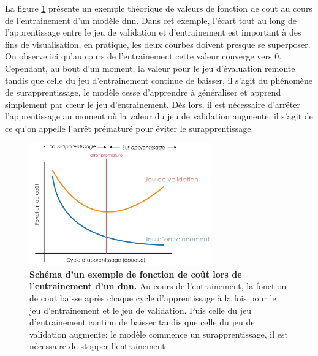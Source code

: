 La figure \ref{fig:loss_func} présente un exemple théorique de valeurs de fonction de cout au cours de l'entrainement d'un modèle \gls{dnn}. Dans cet exemple, l'écart tout au long de l'apprentissage entre le jeu de validation et d'entrainement est important à des fins de visualisation, en pratique, les deux courbes doivent presque se superposer. On observe ici qu'au cours de l'entrainement cette valeur converge vers 0. Cependant, au bout d'un moment, la valeur pour le jeu d'évaluation remonte tandis que celle du jeu d'entrainement continue de baisser, il s'agit du phénomène de surapprentissage, le modèle cesse d'apprendre à généraliser et apprend simplement par cœur le jeu d'entrainement. Dès lors, il est nécessaire d'arrêter l'apprentissage au moment où la valeur du jeu de validation augmente, il s'agit de ce qu'on appelle l'arrêt prématuré pour éviter le surapprentissage.
\begin{figure}[!ht]
 \centering
 \includegraphics[width=0.7\textwidth]{figures/loss_function.png}
 \caption[Schéma d'un exemple de fonction de coût lors d'un entraînement]{\textbf{Schéma d'un exemple de fonction de coût lors de l'entrainement d'un \gls{dnn}.} Au cours de l'entrainement, la fonction de cout baisse après chaque cycle d'apprentissage à la fois pour le jeu d'entrainement et le jeu de validation. Puis celle du jeu d'entrainement continu de baisser tandis que celle du jeu de validation augmente: le modèle commence un surapprentissage, il est nécessaire de stopper l'entrainement}
 \label{fig:loss_func}
\end{figure}
